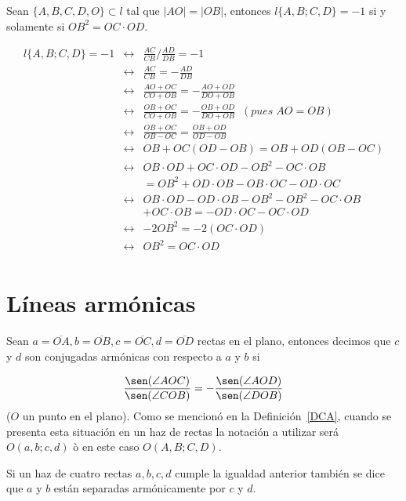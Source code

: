 \begin{prop}\label{P2PPA}
Sean $\{A,B,C,D,O\}\subset l$ tal que $|AO|=|OB|$, entonces $l\{A,B;C,D\}=-1$ si y solamente si $OB^{2}=OC\cdot OD$.
\end{prop}
\begin{pba}

\begin{eqnarray*}
l\{A,B;C,D\}=-1
&\leftrightarrow & \frac{AC}{CB}\Big/\frac{AD}{DB}=-1\\
&\leftrightarrow & \frac{AC}{CB}=-\frac{AD}{DB}\\
&\leftrightarrow & \frac{AO+OC}{CO+OB}=-\frac{AO+OD}{DO+OB}\\
&\leftrightarrow & \frac{OB+OC}{CO+OB}=-\frac{OB+OD}{DO+OB}\;\; (pues\;AO=OB)\\
&\leftrightarrow & \frac{OB+OC}{OB-OC}=\frac{OB+OD}{OD-OB}\\
&\leftrightarrow & OB+OC(OD-OB)=OB+OD(OB-OC)\\
&\leftrightarrow & OB\cdot OD+OC\cdot OD-OB^{2}-OC\cdot OB\\
& & =OB^{2}+OD\cdot OB-OB\cdot OC-OD\cdot OC\\
&\leftrightarrow & OB\cdot OD-OD\cdot OB-OB^{2}-OB^{2}-OC\cdot OB\\
& & +OC\cdot OB=-OD\cdot OC-OC\cdot OD\\
&\leftrightarrow & -2OB^{2}=-2(OC\cdot OD)\\
&\leftrightarrow & OB^{2}=OC\cdot OD\\
\end{eqnarray*}
\end{pba}

\section{Líneas armónicas}
Sean $a=\overline{OA}, b=\overline{OB}, c=\overline{OC}, d=\overline{OD}$ rectas en el plano, 
entonces decimos que $c$ y $d$ son conjugadas armónicas con respecto a $a$ y $b$ si 

$$\frac{\sen(\angle AOC)}{\sen (\angle COB)}=-\frac{\sen (\angle AOD)}{\sen (\angle DOB)}$$
($O$ un punto en el plano). Como se mencionó en la Definición~\ref{DCA}, cuando se presenta esta situación en un haz de rectas la notación a utilizar será $O(a,b;c,d)$ ò en este caso $O(A,B;C,D)$.
 
Si un haz de cuatro rectas $a,b,c,d$ cumple la igualdad anterior también se dice que $a$ y $b$ están separadas armónicamente por $c$ y $d$.

